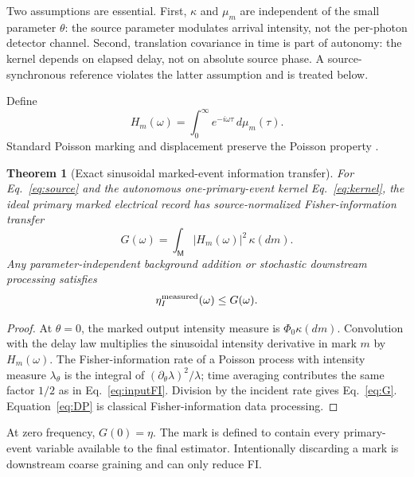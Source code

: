 \documentclass[aps,prapplied,preprint,nofootinbib]{revtex4-2}
\newtheorem{theorem}{Theorem}
\newcommand{\M}{\mathsf M}
\begin{document}
Two assumptions are essential. First, $\kappa$ and $\mu_m$ are independent of the small parameter $\theta$: the source parameter modulates arrival intensity, not the per-photon detector channel. Second, translation covariance in time is part of autonomy: the kernel depends on elapsed delay, not on absolute source phase. A source-synchronous reference violates the latter assumption and is treated below.

Define
\begin{equation}
H_m(\omega)=\int_0^\infty e^{-i\omega\tau}\,d\mu_m(\tau).
\end{equation}
Standard Poisson marking and displacement preserve the Poisson property \cite{Kingman1993,DaleyVereJones2003}.

\begin{theorem}[Exact sinusoidal marked-event information transfer]
For Eq.~\eqref{eq:source} and the autonomous one-primary-event kernel Eq.~\eqref{eq:kernel}, the ideal primary marked electrical record has source-normalized Fisher-information transfer
\begin{equation}
\boxed{
G(\omega)=\int_{\M}|H_m(\omega)|^2\,\kappa(dm).}
\label{eq:G}
\end{equation}
Any parameter-independent background addition or stochastic downstream processing satisfies
\begin{equation}
\eta_I^{\rm measured}(\omega)\le G(\omega).
\label{eq:DP}
\end{equation}
\end{theorem}

\begin{proof}
At $\theta=0$, the marked output intensity measure is $\Phi_0\kappa(dm)$. Convolution with the delay law multiplies the sinusoidal intensity derivative in mark $m$ by $H_m(\omega)$. The Fisher-information rate of a Poisson process with intensity measure $\lambda_\theta$ is the integral of $(\partial_\theta\lambda)^2/\lambda$; time averaging contributes the same factor $1/2$ as in Eq.~\eqref{eq:inputFI}. Division by the incident rate gives Eq.~\eqref{eq:G}. Equation~\eqref{eq:DP} is classical Fisher-information data processing.
\end{proof}

At zero frequency, $G(0)=\eta$. The mark is defined to contain every primary-event variable available to the final estimator. Intentionally discarding a mark is downstream coarse graining and can only reduce FI.


\end{document}
